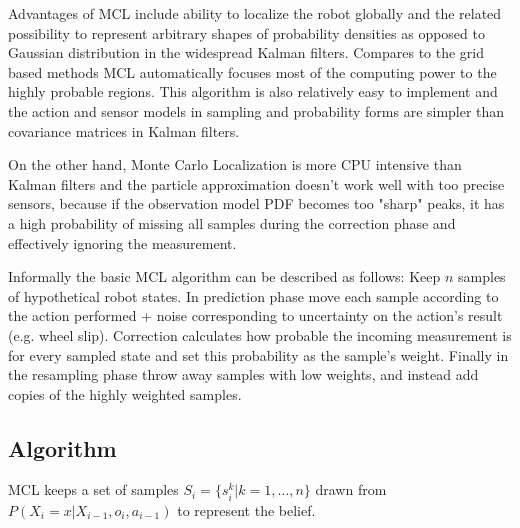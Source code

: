 Advantages of MCL include ability to localize the robot globally and the related
possibility to represent arbitrary shapes of probability densities as opposed to
Gaussian distribution in the widespread Kalman filters.
Compares to the grid based methods MCL automatically focuses most of the
computing power to the highly probable regions.
This algorithm is also relatively easy to implement and the action and sensor models
in sampling and probability forms are simpler than covariance matrices in
Kalman filters.

On the other hand, Monte Carlo Localization is more CPU intensive than Kalman filters
and the particle approximation doesn't work well with too precise sensors,
because if the observation model PDF becomes too "sharp" peaks, it has a high probability
of missing all samples during the correction phase and effectively ignoring the measurement.

Informally the basic MCL algorithm can be described as follows:
Keep \(n\) samples of hypothetical robot states.
In prediction phase move each sample according to the action performed + noise corresponding
to uncertainty on the action's result (e.g. wheel slip).
Correction calculates how probable the incoming measurement is
for every sampled state and set this probability as the sample's weight.
Finally in the resampling phase throw away samples with low weights, and
instead add copies of the highly weighted samples.

\subsection{Algorithm}

MCL keeps a set of samples \(S_i = \{s^k_{i} | k = 1,\dotsc,n\} \) drawn from
\(P(X_i = x | X_{i-1}, o_i, a_{i - 1})\) to represent the belief.

